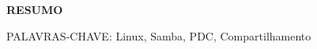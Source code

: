 \begin{center}
\textbf{RESUMO}
\end{center}
\singlespacing

\noindent PALAVRAS-CHAVE: Linux, Samba, PDC, Compartilhamento
